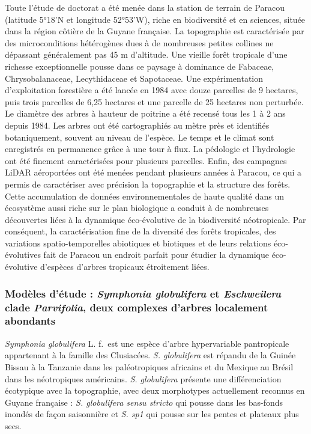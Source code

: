 \documentclass[12pt,twoside,a4paper, a]{article}
\begin{document}
Toute l'étude de doctorat a été menée dans la station de terrain de Paracou (latitude 5°18'N et longitude 52°53'W), riche en biodiversité et en sciences, située dans la région côtière de la Guyane française. La topographie est caractérisée par des microconditions hétérogènes dues à de nombreuses petites collines ne dépassant généralement pas 45 m d'altitude. Une vieille forêt tropicale d'une richesse exceptionnelle pousse dans ce paysage à dominance de Fabaceae, Chrysobalanaceae, Lecythidaceae et Sapotaceae. Une expérimentation d'exploitation forestière a été lancée en 1984 avec douze parcelles de 9 hectares, puis trois parcelles de 6,25 hectares et une parcelle de 25 hectares non perturbée. Le diamètre des arbres à hauteur de poitrine a été recensé tous les 1 à 2 ans depuis 1984. Les arbres ont été cartographiés au mètre près et identifiés botaniquement, souvent au niveau de l'espèce. Le temps et le climat sont enregistrés en permanence grâce à une tour à flux. La pédologie et l'hydrologie ont été finement caractérisées pour plusieurs parcelles. Enfin, des campagnes LiDAR aéroportées ont été menées pendant plusieurs années à Paracou, ce qui a permis de caractériser avec précision la topographie et la structure des forêts. Cette accumulation de données environnementales de haute qualité dans un écosystème aussi riche sur le plan biologique a conduit à de nombreuses découvertes liées à la dynamique éco-évolutive de la biodiversité néotropicale. Par conséquent, la caractérisation fine de la diversité des forêts tropicales, des variations spatio-temporelles abiotiques et biotiques et de leurs relations éco-évolutives fait de Paracou un endroit parfait pour étudier la dynamique éco-évolutive d'espèces d'arbres tropicaux étroitement liées.

\hypertarget{moduxe8les-duxe9tude-symphonia-globulifera-et-eschweilera-clade-parvifolia-deux-complexes-darbres-localement-abondants}{%
\subsubsection{\texorpdfstring{Modèles d'étude : \emph{Symphonia globulifera} et \emph{Eschweilera} clade \emph{Parvifolia}, deux complexes d'arbres localement abondants}{Modèles d'étude : Symphonia globulifera et Eschweilera clade Parvifolia, deux complexes d'arbres localement abondants}}\label{moduxe8les-duxe9tude-symphonia-globulifera-et-eschweilera-clade-parvifolia-deux-complexes-darbres-localement-abondants}}

\emph{Symphonia globulifera} L. f.~est une espèce d'arbre hypervariable pantropicale appartenant à la famille des Clusiacées. \emph{S. globulifera} est répandu de la Guinée Bissau à la Tanzanie dans les paléotropiques africains et du Mexique au Brésil dans les néotropiques américains. \emph{S. globulifera} présente une différenciation écotypique avec la topographie, avec deux morphotypes actuellement reconnus en Guyane française : \emph{S. globulifera sensu stricto} qui pousse dans les bas-fonds inondés de façon saisonnière et \emph{S. sp1} qui pousse sur les pentes et plateaux plus secs.
\end{document}
